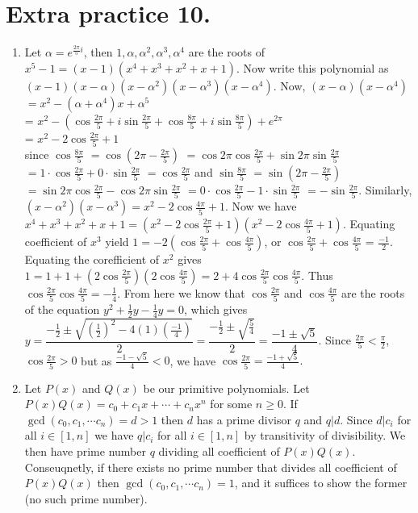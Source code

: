 \documentclass[11pt]{article}
\begin{document}
\section{Extra practice 10.}
\begin{enumerate}
\item Let $\alpha=e^{\frac{2\pi}{5}i}$, then $1, \alpha, \alpha^2, \alpha^3, \alpha^4$ are the roots of $x^5-1=(x-1)(x^4+x^3+x^2+x+1)$. Now write this polynomial as $(x-1)(x-\alpha)(x-\alpha^2)(x-\alpha^3)(x-\alpha^4)$. 
Now, $(x-\alpha)(x-\alpha^4)$\\
$=x^2-(\alpha+\alpha^4)x+\alpha^5$\\
= $x^2-(\cos \frac{2\pi}{5}+i\sin\frac{2\pi}{5}+\cos\frac{8\pi}{5}+i\sin\frac{8\pi}{5})+e^{2\pi}$\\
= $x^2-2\cos\frac{2\pi}{5}+1$ \\
since
$\cos \frac{8\pi}{5}$
$=\cos(2\pi-\frac{2\pi}{5})$
$=\cos 2\pi \cos\frac{2\pi}{5}+\sin 2\pi \sin\frac{2\pi}{5}$
$=1\cdot \cos \frac{2\pi}{5}+0\cdot \sin \frac{2\pi}{5}$
$=\cos \frac{2\pi}{5}$
and
$\sin \frac{8\pi}{5}$
$=\sin(2\pi-\frac{2\pi}{5})$
$=\sin 2\pi \cos\frac{2\pi}{5}-\cos 2\pi \sin\frac{2\pi}{5}$
$=0\cdot \cos \frac{2\pi}{5}-1\cdot \sin \frac{2\pi}{5}$
$=-\sin \frac{2\pi}{5}$.
 Similarly, $(x-\alpha^2)(x-\alpha^3)=x^2-2\cos\frac{4\pi}{5}+1$. Now we have $x^4+x^3+x^2+x+1=(x^2-2\cos\frac{2\pi}{5}+1)(x^2-2\cos\frac{4\pi}{5}+1)$. Equating coefficient of $x^3$ yield $1=-2(\cos\frac{2\pi}{5}+\cos\frac{4\pi}{5})$, or $\cos\frac{2\pi}{5}+\cos\frac{4\pi}{5}$ = $\frac{-1}{2}$. Equating the corefficient of $x^2$ gives $1=1+1+(2\cos\frac{2\pi}{5})(2\cos\frac{4\pi}{5})=2+4\cos\frac{2\pi}{5}\cos\frac{4\pi}{5}$. Thus $\cos\frac{2\pi}{5}\cos\frac{4\pi}{5}=-\frac{1}{4}$. From here we know that $\cos\frac{2\pi}{5}$ and $\cos\frac{4\pi}{5}$ are the roots of the equation $y^2+\frac{1}{2}y-\frac{1}{4}y=0$, which gives $y=\dfrac{-\frac{1}{2}\pm\sqrt{(\frac{1}{2})^2-4(1)(\frac{-1}{4})}}{2}=\dfrac{-\frac{1}{2}\pm\sqrt{\frac{5}{4}}}{2}=\dfrac{-1\pm\sqrt{5}}{4}.$ Since $\frac{2\pi}{5}<\frac{\pi}{2}$, $\cos\frac{2\pi}{5}>0$ but as $\frac{-1-\sqrt{5}}{4}<0$, we have $\cos\frac{2\pi}{5}=\frac{-1+\sqrt{5}}{4}.$

\item Let $P(x)$ and $Q(x)$ be our primitive polynomials. Let $P(x)Q(x)=c_0+c_1x+\cdots +c_n x^n$ for some $n\ge 0$. If $\gcd (c_0, c_1, \cdots c_n)=d>1$ then $d$ has a prime divisor $q$ and $q|d$. Since $d|c_i$ for all $i\in [1,n]$ we have $q|c_i$ for all $i\in [1,n]$ by transitivity of divisibility. We then have prime number $q$ dividing all coefficient of $P(x)Q(x)$. Conseuqnetly, if there exists no prime number that divides all coefficient of $P(x)Q(x)$ then $\gcd (c_0, c_1, \cdots c_n)=1$, and it suffices to show the former (no such prime number).


\end{enumerate}
\end{document}
